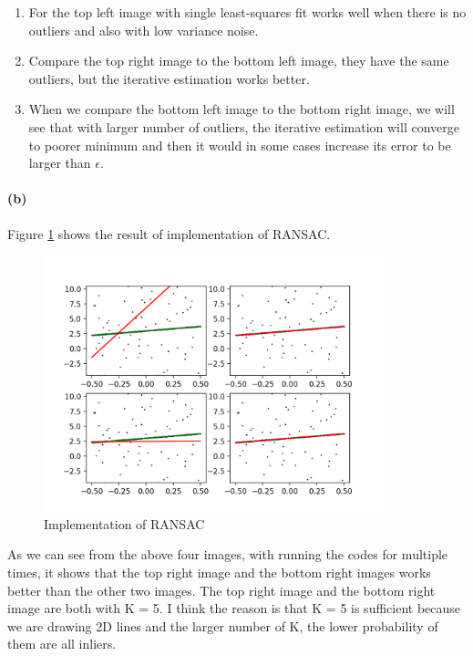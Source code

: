 \documentclass{article}
\newcommand{\spart}[1]{\paragraph{(#1)}}
\begin{document}
\begin{enumerate}
\item For the top left image with single least-squares fit works well when there is no outliers and also with low variance noise.
\item Compare the top right image to the bottom left image, they have the same outliers, but the iterative estimation works better.
\item When we compare the bottom left image to the bottom right image, we will see that with larger number of outliers, the iterative estimation will converge to poorer minimum and then it would in some cases increase its error to be larger than $\epsilon$.
\end{enumerate}

\spart{b} Figure \ref{fig:prob2b} shows the result of implementation of RANSAC.
\begin{figure}[!h]
  \centering
  \includegraphics[height=20em]{code/outputs/prob2b.png}
  \caption{Implementation of RANSAC}
  \label{fig:prob2b}
\end{figure}

As we can see from the above four images, with running the codes for multiple times, it shows that the top right image and the bottom right images works better than the other two images. The top right image and the bottom right image are both with K = 5. I think the reason is that K = 5 is sufficient because we are drawing 2D lines and the larger number of K, the lower probability of them are all inliers.
\end{document}
